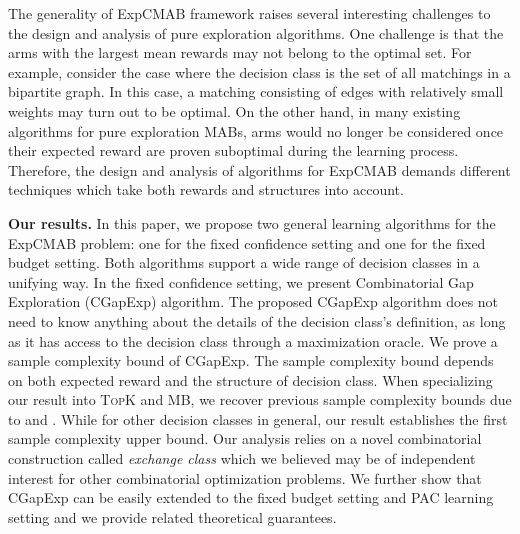 \documentclass{article}
\newcommand{\junk}[1]{}
\newcommand{\Algorithm}{{\small \textsf{CGapExp}}\xspace}
\newcommand{\Problem}{{\small \textsf{ExpCMAB}}\xspace}
\newcommand{\MultiIdent}{\textsc{TopK}\xspace}
\newcommand{\MultiBandit}{\textsc{MB}\xspace}
\begin{document}
The generality of \Problem framework raises several interesting challenges to the design and analysis of pure exploration algorithms. 
One challenge is that the arms with the largest mean rewards may not belong to the optimal set. For example, consider the case where the decision class is the set of all matchings in a bipartite graph.  
In this case, a matching consisting of edges with relatively small weights may turn out to be optimal.  
On the other hand, in many existing algorithms for pure exploration MABs, arms would no longer be considered once their expected reward are proven suboptimal during the learning process. 
Therefore, the design and analysis of algorithms for \Problem demands different techniques which take both rewards and structures into account.
\junk{
Before describing our results, we recall two common settings in pure exploration problems: fixed confidence and fixed budget. 
In the fixed confidence setting, the learner need to guarantee that she correctly identifies the optimal set with high probability while uses a small number of rounds(samples).  
In the fixed budget setting, the learner uses at most a fixed number of samples and she need to minimize her probability of error (identifies a suboptimal set).
}

\textbf{Our results.}
In this paper, we propose two general learning algorithms for the \Problem problem: one for the fixed confidence setting and one for the fixed budget setting.
Both algorithms support a wide range of decision classes in a unifying way. 
In the fixed confidence setting, we present Combinatorial Gap Exploration (\Algorithm) algorithm.
The proposed \Algorithm algorithm does not need to know anything about the details of the decision class's definition, as long as it has access to the decision class through a maximization oracle.
We prove a sample complexity bound of \Algorithm. 
The sample complexity bound depends on both expected reward and the structure of decision class. 
When specializing our result into \MultiIdent and \MultiBandit, we recover previous sample complexity bounds due to \citet{kalyanakrishnan2012pac} and \citet{gabillon2012best}.
While for other decision classes in general, our result establishes the first sample complexity upper bound. 
Our analysis relies on a novel combinatorial construction called \emph{exchange class} which we believed may be of independent interest for other combinatorial optimization problems. 
We further show that \Algorithm can be easily extended to the fixed budget setting and PAC learning setting and we provide related theoretical guarantees.  
\end{document}
